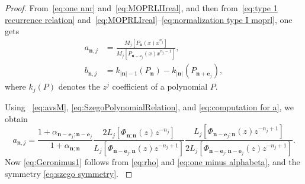 \documentclass[reqno,centertags,11pt,draft]{amsart}
\newcommand{\abs}[1]{\left|#1\right|}
\newcommand{\red}[1]{{\color{red}#1}}
\begin{document}
\begin{proof}
    From~\eqref{eq:one nnr} and~\eqref{eq:MOPRLIIreal}, and then from~\eqref{eq:type 1 recurrence relation} and~\eqref{eq:MOPRLIreal}--\eqref{eq:normalization type I moprl}, one gets
    \begin{align}
    \label{eq:avsM}
        a_{\bm{n},j} 
        &= \frac{ M_j[P_{\bm{n}}(x)x^{n_j} ]}{ M_j[P_{\bm{n}-\bm{e}_j}(x) x^{n_j - 1}] },
        \\
    \label{eq:bvsM}
        b_{\bm{n},j}
        & = k_{|\bm{n}|-1}(P_{\bm{n}}) - k_{|\bm{n}|}(P_{\bm{n}+\bm{e}_j}),
    \end{align}
    where $k_j(P)$ denotes the $z^j$ coefficient of a polynomial $P$.

    {Using ~\eqref{eq:avsM}, \eqref{eq:SzegoPolynomialRelation}, and \eqref{eq:computation for a}, we obtain
    \begin{equation}
        a_{\bm{n},j} = \frac{1+\alpha_{\bm{n}-\bm{e}_j;\bm{n}-\bm{e}_j}}{1+\alpha_{\bm{n};\bm{n}}}\frac{2L_j[\Phi_{\bm{n};\bm{n}}(z)z^{-n_j}]}{L_j[\Phi_{\bm{n}-\bm{e}_j;\bm{n}}(z)z^{-n_j+1}]}\frac{L_j[\Phi_{\bm{n}-\bm{e}_j;\bm{n}}(z)z^{-n_j+1}]}{2L_j[\Phi_{\bm{n}-\bm{e}_j;\bm{n}-\bm{e}_j}(z)z^{-n_j+1}]}.
    \end{equation}
    Now \eqref{eq:Geronimus1} follows from \eqref{eq:rho} and \eqref{eq:one minus alphabeta}, and the symmetry \eqref{eq:szego symmetry}.
    }

    

\end{proof}
\end{document}
